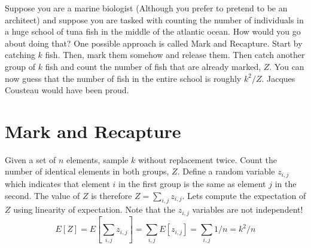 \documentclass{article}
\begin{document}


Suppose you are a marine biologist (Although you prefer to pretend to be an architect) and
suppose you are tasked with counting the number of individuals in a huge school of tuna fish in 
the middle of the atlantic ocean. How would you go about doing that? 
One possible approach is called Mark and Recapture.
Start by catching $k$ fish. Then, mark them somehow 
and release them. Then catch another group of $k$ fish and count the number of fish that are already marked, $Z$.
You can now guess that the number of fish in the entire school is roughly $k^2/Z$.
Jacques Cousteau would have been proud.

\section*{Mark and Recapture}
Given a set of $n$ elements, sample $k$ without replacement twice.
Count the number of identical elements in both groups, $Z$.
Define a random variable $z_{i,j}$ which indicates that
element $i$ in the first group is the same as element $j$ in the second.
The value of $Z$ is therefore $Z = \sum_{i,j} z_{i,j}$.
Lets compute the expectation of $Z$ using linearity of expectation.
Note that the $z_{i,j}$ variables are not independent!
\begin{equation}
E[Z] = E[\sum_{i,j} z_{i,j}] = \sum_{i,j} E [z_{i,j}] = \sum_{i,j} 1/n = k^2/n
\end{equation}


%
\end{document}
